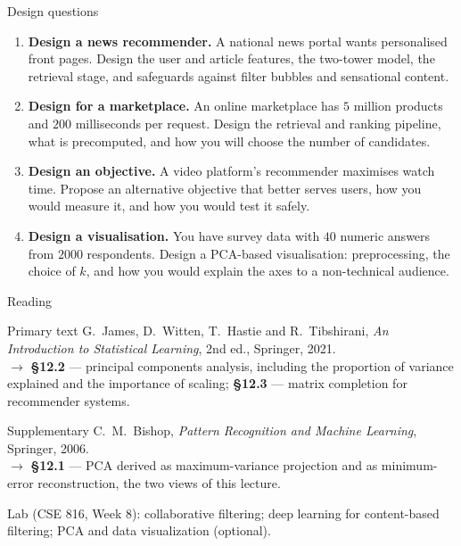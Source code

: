 \documentclass[aspectratio=169,10pt]{beamer}
\begin{document}
\begin{frame}{Design questions}
  \footnotesize
  \begin{enumerate}
    \item \textbf{Design a news recommender.} A national news portal wants personalised
          front pages. Design the user and article features, the two-tower model, the
          retrieval stage, and safeguards against filter bubbles and sensational content.
          \hfill{}
    \item \textbf{Design for a marketplace.} An online marketplace has $5$ million products
          and $200$ milliseconds per request. Design the retrieval and ranking pipeline,
          what is precomputed, and how you will choose the number of candidates.
          \hfill{}
    \item \textbf{Design an objective.} A video platform's recommender maximises watch time.
          Propose an alternative objective that better serves users, how you would
          measure it, and how you would test it safely. \hfill{}
    \item \textbf{Design a visualisation.} You have survey data with $40$ numeric answers
          from $2000$ respondents. Design a PCA-based visualisation: preprocessing, the
          choice of $k$, and how you would explain the axes to a non-technical audience.
          \hfill{}
  \end{enumerate}
\end{frame}

\begin{frame}{Reading}
  \begin{block}{Primary text}
    G.~James, D.~Witten, T.~Hastie and R.~Tibshirani,
    \emph{An Introduction to Statistical Learning}, 2nd ed., Springer, 2021.\\[2pt]
    \hfill{\small$\rightarrow$ \textbf{\S12.2} --- principal components analysis, including
    the proportion of variance explained and the importance of scaling;
    \textbf{\S12.3} --- matrix completion for recommender systems.}
  \end{block}
  \begin{block}{Supplementary}
    C.~M.~Bishop, \emph{Pattern Recognition and Machine Learning}, Springer, 2006.\\[2pt]
    \hfill{\small$\rightarrow$ \textbf{\S12.1} --- PCA derived as maximum-variance projection
    and as minimum-error reconstruction, the two views of this lecture.}
  \end{block}
  \vspace{1mm}
  \begin{center}
    \small\color{cugray}
    Lab (CSE 816, Week 8): collaborative filtering; deep learning for content-based
    filtering; PCA and data visualization (optional).
  \end{center}
\end{frame}
\end{document}
